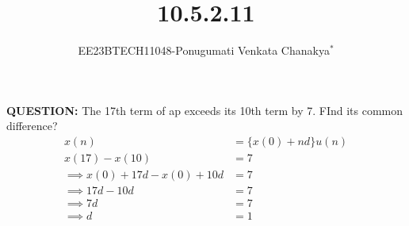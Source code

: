 \documentclass[journal,12pt,onecolumn]{IEEEtran}
\theoremstyle{remark}
\begin{document}
 
 \vspace{3cm}
 \title{\textbf{10.5.2.11}}
 \author{EE23BTECH11048-Ponugumati Venkata Chanakya$^{*}$%
 }
 \maketitle

 \bigskip
 \renewcommand{\thefigure}{\theenumi}
 \renewcommand{\thetable}{\theenumi}
 \textbf{QUESTION:}
 The 17th term of ap exceeds its 10th term by 7. FInd its common difference?\\
 \solution
\fi
 \begin{align}
     x(n) &= \{x(0)+nd\}u(n) \label{eq 10.5.2.11_1}\\
     x(17)-x(10) &= 7\\
    \implies {x(0)+17d}-{x(0)+10d} &= 7\\
    \implies 17d-10d &= 7\\
    \implies 7d &= 7\\
    \implies d &= 1
 \end{align}
\end{document}
